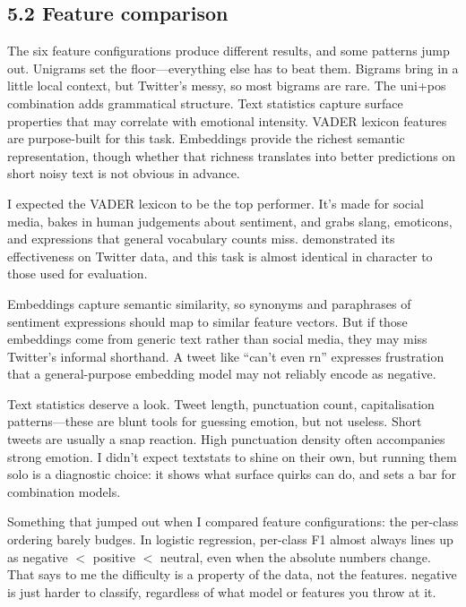 \documentclass[12pt]{article}
\begin{document}
\subsection*{5.2 Feature comparison}



The six feature configurations produce different results, and some patterns jump out. Unigrams set the floor---everything else has to beat them. Bigrams bring in a little local context, but Twitter's messy, so most bigrams are rare. The uni+pos combination adds grammatical structure. Text statistics capture surface properties that may correlate with emotional intensity. VADER lexicon features are purpose-built for this task. Embeddings provide the richest semantic representation, though whether that richness translates into better predictions on short noisy text is not obvious in advance.

I expected the VADER lexicon to be the top performer. It's made for social media, bakes in human judgements about sentiment, and grabs slang, emoticons, and expressions that general vocabulary counts miss. \citet{hutto2014vader} demonstrated its effectiveness on Twitter data, and this task is almost identical in character to those used for evaluation.

Embeddings capture semantic similarity, so synonyms and paraphrases of sentiment expressions should map to similar feature vectors. But if those embeddings come from generic text rather than social media, they may miss Twitter's informal shorthand. A tweet like ``can't even rn'' expresses frustration that a general-purpose embedding model may not reliably encode as negative.

Text statistics deserve a look. Tweet length, punctuation count, capitalisation patterns---these are blunt tools for guessing emotion, but not useless. Short tweets are usually a snap reaction. High punctuation density often accompanies strong emotion. I didn't expect textstats to shine on their own, but running them solo is a diagnostic choice: it shows what surface quirks can do, and sets a bar for combination models.

Something that jumped out when I compared feature configurations: the per-class ordering barely budges. In logistic regression, per-class F1 almost always lines up as negative $<$ positive $<$ neutral, even when the absolute numbers change. That says to me the difficulty is a property of the data, not the features. negative is just harder to classify, regardless of what model or features you throw at it.
\end{document}

